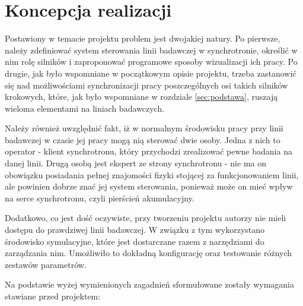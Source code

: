 \clearpage
\section{Koncepcja realizacji}
\label{sec:koncepcja}

\quad Postawiony w temacie projektu problem jest dwojakiej natury. Po pierwsze, należy zdefiniować system sterowania linii badawczej w synchrotronie, określić w nim rolę silników i zaproponować programowe sposoby wizualizacji ich pracy. Po drugie, jak było wspomniane w początkowym opisie projektu, trzeba zastanowić się nad możliwościami synchronizacji pracy poszczególnych osi takich silników krokowych, które, jak było wspomniane w rozdziale \ref{sec:podstawa}, ruszają wieloma elementami na liniach badawczych.

Należy również uwzględnić fakt, iż w normalnym środowisku pracy przy linii badawczej w czasie jej pracy mogą nią sterować dwie osoby. Jedna z nich to operator - klient synchrotronu, który przychodzi zrealizować pewne badania na danej linii. Drugą osobą jest ekspert ze strony synchrotronu - nie ma on obowiązku posiadania pełnej znajomości fizyki stojącej za funkcjonowaniem linii, ale powinien dobrze znać jej system sterowania, ponieważ może on mieć wpływ na serce synchrotronu, czyli pierścień akumulacyjny.

Dodatkowo, co jest dość oczywiste, przy tworzeniu projektu autorzy nie mieli dostępu do prawdziwej linii badawczej. W związku z tym wykorzystano środowisko symulacyjne, które jest dostarczane razem z narzędziami do zarządzania nim. Umożliwiło to dokładną konfigurację oraz testowanie różnych zestawów parametrów.

Na podstawie wyżej wymienionych zagadnień sformułowane zostały wymagania stawiane przed projektem:

